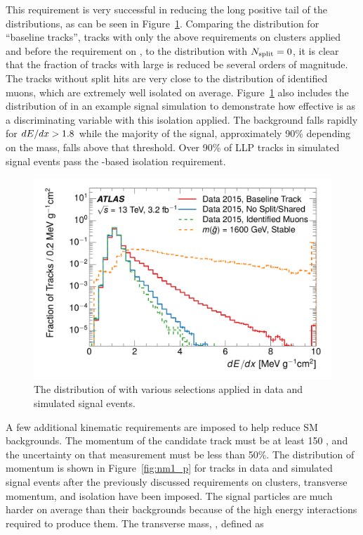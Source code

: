 This requirement is very successful in reducing the long positive tail of the \dedx distributions, as can be seen in Figure~\ref{fig:dedx_isolation}.
Comparing the distribution for ``baseline tracks'', tracks with only the above requirements on clusters applied and before the requirement on \Nsplit, to the distribution with $N_{\mathrm{split}} = 0$, it is clear that the fraction of tracks with large \dedx is reduced be several orders of magnitude.
The tracks without split hits are very close to the \dedx distribution of identified muons, which are extremely well isolated on average. 
Figure~\ref{fig:dedx_isolation} also includes the distribution of \dedx in an example signal simulation to demonstrate how effective \dedx is as a discriminating variable with this isolation applied. 
The background falls rapidly for $dE/dx > 1.8$ \MeVgcm while the majority of the signal, approximately 90\% depending on the mass, falls above that threshold.
Over 90\% of \ac{LLP} tracks in simulated signal events pass the \Nsplit-based isolation requirement.


\begin{figure}[h]
\centering
\includegraphics[width=\fullfig]{figures/dedx_isolation.pdf}
\caption{The distribution of \dedx with various selections applied in data and simulated signal events.}
\label{fig:dedx_isolation}
\end{figure}

A few additional kinematic requirements are imposed to help reduce \ac{SM} backgrounds. 
The momentum of the candidate track must be at least 150 \GeV, and the uncertainty on that measurement must be less than 50\%. 
The distribution of momentum is shown in Figure~\ref{fig:nm1_p} for tracks in data and simulated signal events after the previously discussed requirements on clusters, transverse momentum, and isolation have been imposed.
The signal particles are much harder on average than their backgrounds because of the high energy interactions required to produce them.
The transverse mass, \mt, defined as 

